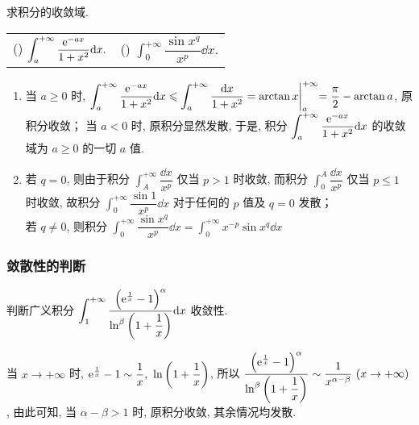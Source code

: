 \begin{example}
    求积分的收敛域.
    \setcounter{magicrownumbers}{0}
    \begin{table}[H]
        \centering
        \begin{tabular}{l | l}
            (\rownumber{}) $\displaystyle\int_{a}^{+\infty}\dfrac{\mathrm{e} ^{-ax}}{1+x^2}\dd x.$ & (\rownumber{}) $\displaystyle\int_{0}^{+\infty}\dfrac{\sin x^q}{x^p}\dd x.$
        \end{tabular}
    \end{table}
\end{example}
\begin{solution}
    \begin{enumerate}[label=(\arabic{*})]
        \item 当 $a\geqslant 0$ 时, $\displaystyle \int_{a}^{+\infty}\dfrac{\mathrm{e} ^{-ax}}{1+x^2}\dd x\leqslant \int_{a}^{+\infty}\dfrac{\dd x}{1+x^2}=\arctan x\biggl |_a^{+\infty}=\dfrac{\pi}{2}-\arctan a$, 原积分收敛；
              当 $a<0$ 时, 原积分显然发散, 于是, 积分 $\displaystyle\int_{a}^{+\infty}\dfrac{\mathrm{e} ^{-ax}}{1+x^2}\dd x$ 的收敛域为 $a\geqslant 0$ 的一切 $a$ 值.
        \item 若 $q=0$, 则由于积分 $\displaystyle\int_{A}^{+\infty}\dfrac{\dd x}{x^p}$ 仅当 $p>1$ 时收敛, 而积分 $\displaystyle\int_{0}^{A}\dfrac{\dd x}{x^p}$ 仅当 $p\leqslant1$ 时收敛, 故积分
              $\displaystyle\int_{0}^{+\infty}\dfrac{\sin 1}{x^p}\dd x$ 对于任何的 $p$ 值及 $q=0$ 发散；\\
              若 $q\neq 0$, 则积分 $\displaystyle\int_{0}^{+\infty}\dfrac{\sin x^q}{x^p}\dd x=\int_{0}^{+\infty}x^{-p}\sin x^q\dd x$
    \end{enumerate}
\end{solution}

\subsubsection{敛散性的判断}

\begin{example}
    判断广义积分 $\displaystyle\int_{1}^{+\infty}\dfrac{\qty(\mathrm{e} ^{\frac{1}{x}}-1)^\alpha}{\ln^\beta \qty(1+\dfrac{1}{x})}\dd x$ 收敛性.
\end{example}
\begin{solution}
    当 $x\to+\infty $ 时, $\mathrm{e} ^{\frac{1}{x}}-1\sim \dfrac{1}{x},~\ln\qty(1+\dfrac{1}{x})$, 所以 $\displaystyle \dfrac{\qty(\mathrm{e} ^{\frac{1}{x}}-1)^\alpha}{\ln^\beta \qty(1+\dfrac{1}{x})}\sim \dfrac{1}{x^{\alpha-\beta}}~  (x\to+\infty)$, 
    由此可知, 当 $\alpha-\beta>1$ 时, 原积分收敛, 其余情况均发散.
\end{solution}

